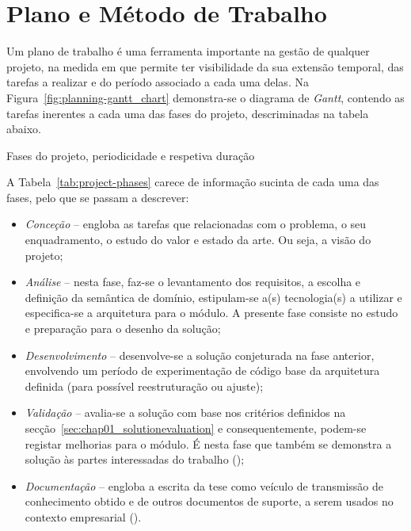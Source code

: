 \section{Plano e Método de Trabalho}
\label{sec:chap01_workmethodology}

Um plano de trabalho é uma ferramenta importante na gestão de qualquer projeto, na medida em que permite ter visibilidade da sua extensão temporal, das tarefas a realizar e do período associado a cada uma delas. Na Figura~\ref{fig:planning-gantt_chart} demonstra-se o diagrama de \textit{Gantt}, contendo as tarefas inerentes a cada uma das fases do projeto, descriminadas na tabela abaixo.

\begin{table}[!ht]
\caption{Fases do projeto, periodicidade e respetiva duração}
\label{tab:project-phases}
\centering
\resizebox{\textwidth}{!}{}
\end{table}

A Tabela~\ref{tab:project-phases} carece de informação sucinta de cada uma das fases, pelo que se passam a descrever:

\begin{itemize}
    \item
    {
        \textit{Conceção} -- engloba as tarefas que relacionadas com o problema, o seu enquadramento, o estudo do valor e estado da arte. Ou seja, a visão do projeto;
    }
    \item
    {
        \textit{Análise} -- nesta fase, faz-se o levantamento dos requisitos, a escolha e definição da semântica de domínio, estipulam-se a(s) tecnologia(s) a utilizar e especifica-se a arquitetura para o módulo. A presente fase consiste no estudo e preparação para o desenho da solução; 
    }
    \item
    {
        \textit{Desenvolvimento} -- desenvolve-se a solução conjeturada na fase anterior, envolvendo um período de experimentação de código base da arquitetura definida (para possível reestruturação ou ajuste);
    }
    \item
    {
        \textit{Validação} -- avalia-se a solução com base nos critérios definidos na secção~\ref{sec:chap01_solutionevaluation} e consequentemente, podem-se registar melhorias para o módulo. É nesta fase que também se demonstra a solução às partes interessadas do trabalho ();
    }
    \item
    {
        \textit{Documentação} -- engloba a escrita da tese como veículo de transmissão de conhecimento obtido e de outros documentos de suporte, a serem usados no contexto empresarial ().
    }
\end{itemize}

